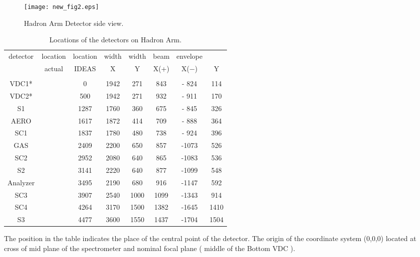 \documentclass[12pt]{article}
\begin{document}
\begin{figure}
\begin{center}
\texttt{[image: new\_fig2.eps]}
{\linespread{1.}
\caption{ Hadron Arm Detector side view.}
\label{Hadron_Arm_Detector_side_view}}
\end{center}
\end{figure}
%
\begin{table}[hbtp]
\begin{center}
\caption{Locations of the detectors on Hadron Arm.}
\begin{tabular}{cccccccc}
detector&location& location&  width &   width &    beam  & envelope&   \\
        & actual &   IDEAS &     X  &     Y   &      X(+)&  X($-$) &   Y       \\  \hline
       &        &          &        &         &          &         &           \\  \hline    
VDC1*  &        &         0&    1942&     271 &     843  &  - 824  &   114     \\    
VDC2*  &        &       500&    1942&     271 &     932  &  - 911  &   170     \\ 
S1     &        &      1287&    1760&     360 &     675  &  - 845  &   326     \\    
AERO   &        &      1617&    1872&     414 &     709  &  - 888  &   364     \\
SC1    &        &      1837&    1780&     480 &     738  &  - 924  &   396     \\    
GAS    &        &      2409&    2200&     650 &     857  &  -1073  &   526     \\    
SC2    &        &      2952&    2080&     640 &     865  &  -1083  &   536     \\   
S2     &        &      3141&    2220&     640 &     877  &  -1099  &   548     \\   
Analyzer&       &      3495&    2190&     680 &     916  &  -1147  &   592     \\   
SC3    &        &      3907&    2540&    1000 &    1099  &  -1343  &   914     \\  
SC4    &        &      4264&    3170&    1500 &    1382  &  -1645  &  1410     \\    
S3     &        &      4477&    3600&    1550 &    1437  &  -1704  &  1504     \\  \hline
\end{tabular}
\end{center}
\end{table}

The position in the table indicates the place of the central point of the 
detector. The origin of the coordinate system (0,0,0) located at cross of 
mid plane of the spectrometer and nominal focal plane ( middle of the Bottom VDC ).
\end{document}
